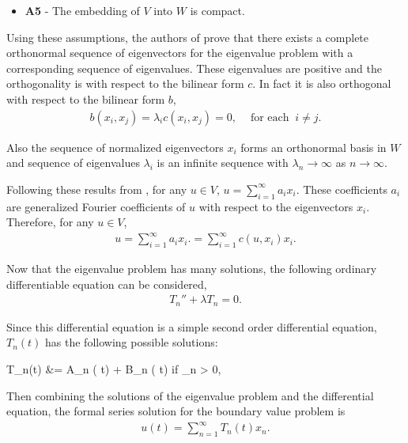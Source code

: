 		\begin{itemize}
			\item[] \textbf{A5} - The embedding of $V$ into $W$ is compact.
		\end{itemize}


		Using these assumptions, the authors of \cite{CVV18} prove that there exists a complete orthonormal sequence of eigenvectors for the eigenvalue problem with a corresponding sequence of eigenvalues. These eigenvalues are positive and the orthogonality is with respect to the bilinear form $c$. In fact it is also orthogonal with respect to the bilinear form $b$,
		\begin{eqnarray*}
			b(x_i, x_j) = \lambda_i c(x_i, x_j) = 0, \ \ \ \ \textrm{ for each } \ i \neq j.
		\end{eqnarray*}

		Also the sequence of normalized eigenvectors ${x_i}$ forms an orthonormal basis in $W$ and sequence of eigenvalues ${\lambda_i}$ is an infinite sequence with $\lambda_n \rightarrow \infty$ as $n \rightarrow \infty$. 

		Following these results from \cite{CVV18}, for any $u \in V$, $\displaystyle u = \sum_{i=1}^{\infty} a_i x_i$. These coefficients $a_i$ are generalized Fourier coefficients of $u$ with respect to the eigenvectors $x_i$. Therefore, for any $u \in V$,
		\begin{eqnarray*}
			u = \sum_{i=1}^{\infty} a_i x_i. = \sum_{i=1}^{\infty} c(u, x_i)x_i.
		\end{eqnarray*}

		Now that the eigenvalue problem has many solutions, the following ordinary differentiable equation can be considered,
		\begin{eqnarray*}
			T_n'' + \lambda T_n = 0. 
		\end{eqnarray*}

		Since this differential equation is a simple second order differential equation, $T_n(t)$ has the following possible solutions:
		\begin{flalign}
			T_n(t) &=  A_n \cos( t) + B_n \sin( t) \quad \textrm{ if } \lambda_n > 0, \label{lambda_1}
		\end{flalign}

		Then combining the solutions of the eigenvalue problem and the differential equation, the formal series solution for the boundary value problem is
		\begin{eqnarray}
			u(t) = \sum_{n=1}^{\infty} T_n(t)x_n. \label{eq:1D_Model:ModalAnalysisSeriesSolution}
		\end{eqnarray}


